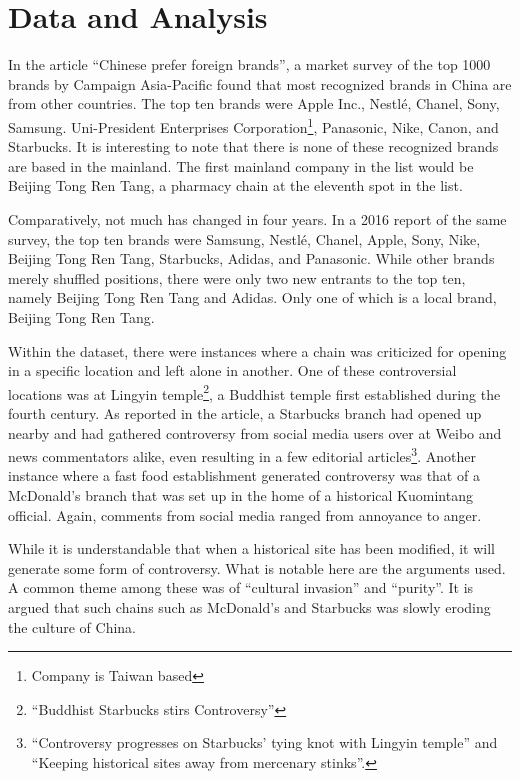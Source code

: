 \chapter{Data and Analysis}

In the article ``Chinese prefer foreign brands'', a market survey of the top
1000 brands by Campaign
Asia-Pacific found that most recognized brands in China are from other
countries. The top ten brands were Apple Inc., Nestlé, Chanel, Sony, Samsung.
Uni-President Enterprises Corporation\footnote{Company is Taiwan based},
Panasonic, Nike, Canon, and Starbucks. It is interesting to note that there is
none of these recognized brands are based in the mainland. The first mainland
company in the list would be Beijing Tong Ren Tang, a pharmacy chain at the
eleventh spot in the list.

Comparatively, not much has changed in four years. In a 2016 report of the
same survey, the top ten brands were Samsung, Nestlé, Chanel, Apple, Sony, Nike,
Beijing Tong Ren Tang, Starbucks, Adidas, and Panasonic. While other brands
merely shuffled positions, there were only two new entrants to the top ten,
namely Beijing Tong Ren Tang and Adidas. Only one of which is a local brand,
Beijing Tong Ren Tang.


Within the dataset, there were instances where a chain was criticized for
opening in a specific location and left alone in another. One of these
controversial locations was at Lingyin temple\footnote{``Buddhist Starbucks
stirs Controversy''}, a Buddhist temple first established during the fourth
century. As reported in the article, a Starbucks branch had opened up nearby and
had gathered controversy from social media users over at Weibo and news
commentators alike, even resulting in a few editorial
articles\footnote{``Controversy progresses on Starbucks' tying knot with Lingyin
temple'' and ``Keeping historical sites away from mercenary stinks''.}. Another
instance where a fast food establishment generated controversy was that of a
McDonald's branch that was set up in the home of a historical Kuomintang
official. Again, comments from social media ranged from annoyance to anger.

While it is understandable that when a historical site has been modified, it
will generate some form of controversy. What is notable here are the arguments
used. A common theme among these was of ``cultural invasion'' and ``purity''. It
is argued that such chains such as McDonald's and Starbucks was slowly
eroding the culture of China.

